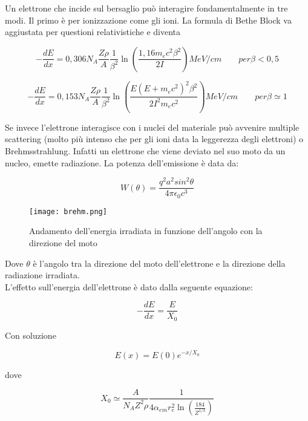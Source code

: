 \documentclass [a4paper, twoside] {book}
\begin{document}
Un elettrone che incide sul bersaglio può interagire fondamentalmente in tre modi. Il primo è per ionizzazione come gli ioni. La formula di Bethe Block va aggiustata per questioni relativistiche e diventa

\begin{equation}
-\frac{dE}{dx}=0,306 N_A\frac{Z\rho}{A}\frac{1}{\beta^2}\ln(\frac{1,16m_ec^2\beta^2}{2I}) MeV/cm\qquad per \beta<0,5
\end{equation}

\begin{equation}
-\frac{dE}{dx}=0,153 N_A\frac{Z\rho}{A}\frac{1}{\beta^2}\ln(\frac{E(E+m_ec^2)^2\beta^2}{2I^2m_ec^2}) MeV/cm \qquad per \beta\simeq 1
\end{equation}

Se invece l'elettrone interagisce con i nuclei del materiale può avvenire multiple scattering (molto più intenso che per gli ioni data la leggerezza degli elettroni) o Brehmsstrahlung. 
Infatti un elettrone che viene deviato nel suo moto da un nucleo, emette radiazione. La potenza dell'emissione è data da:

\begin{equation}
W(\theta)=\frac{q^2a^2sin^2\theta}{4\pi\epsilon_{0}c^3}
\end{equation}

\begin{figure} []
\centering
		\texttt{[image: brehm.png]}
		\caption{Andamento dell'energia irradiata in funzione dell'angolo con la direzione del moto}
         \label{brehmtheta}
\end{figure}

Dove $\theta$ è l'angolo tra la direzione del moto dell'elettrone e la direzione della radiazione irradiata.\\

L'effetto sull'energia dell'elettrone è dato dalla seguente equazione:

\begin{equation}
-\frac{dE}{dx}=\frac{E}{X_0}
\end{equation}

Con soluzione

\begin{equation}
E(x)=E(0)e^{-x/X_0}
\end{equation}

dove 

\begin{equation}
X_0\simeq\frac{A}{N_A Z^2 \rho}\frac{1}{4 \alpha_{em}r_e^2 \ln(\frac{184}{Z^{1/3}})}
\end{equation}
\end{document}
